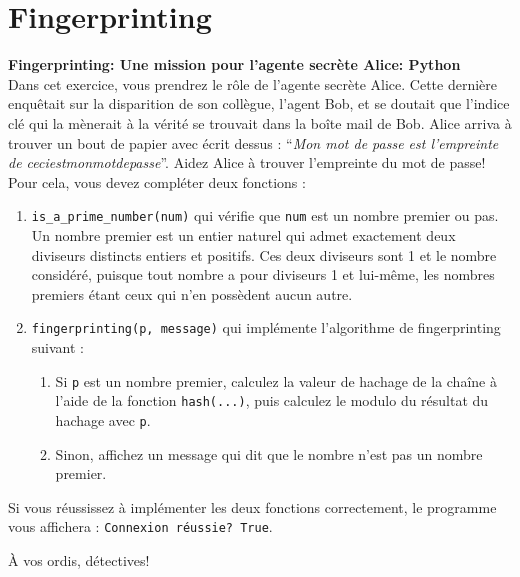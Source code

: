 \section{Fingerprinting}
\begin{Exercice}[15 minutes]\textbf{Fingerprinting: Une mission pour l'agente secrète Alice: Python}\\
    Dans cet exercice, vous prendrez le rôle de l'agente secrète Alice. Cette dernière enquêtait sur la disparition de son collègue,
    l'agent Bob, et se doutait que l'indice clé qui la mènerait à la vérité se trouvait dans la boîte mail de Bob. Alice arriva à trouver
    un bout de papier avec écrit dessus : ``\textit{Mon mot de passe est l'empreinte de ceciestmonmotdepasse}''. Aidez Alice à trouver l'empreinte du mot de passe! \\

    Pour cela, vous devez compléter deux fonctions :
    \begin{enumerate}
        \item \lstinline{is_a_prime_number(num)} qui vérifie que \lstinline{num} est un nombre premier ou pas. Un nombre premier est un entier naturel 
        qui admet exactement deux diviseurs distincts entiers et positifs. Ces deux diviseurs sont 1 et le nombre considéré, 
        puisque tout nombre a pour diviseurs 1 et lui-même, les nombres premiers étant ceux qui n’en possèdent aucun autre.
        
        \item \lstinline{fingerprinting(p, message)} qui implémente l'algorithme de fingerprinting suivant :
              \begin{enumerate}
                  \item Si \lstinline{p} est un nombre premier, calculez la valeur de hachage de la chaîne à l'aide de la fonction \lstinline{hash(...)}, puis calculez le modulo du résultat du hachage avec \lstinline{p}.
                  \item Sinon, affichez un message qui dit que le nombre n'est pas un nombre premier.    
              \end{enumerate}
    \end{enumerate}

    Si vous réussissez à implémenter les deux fonctions correctement, le programme vous affichera : \lstinline{Connexion réussie? True}.

    À vos ordis, détectives! \newline 

    


\end{Exercice}
